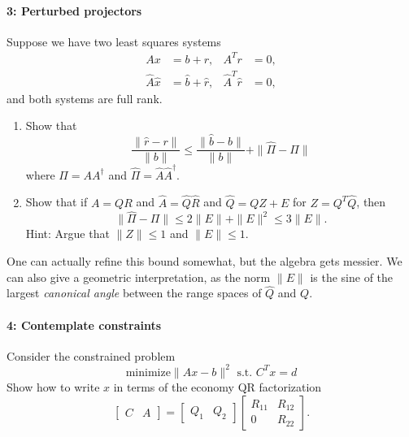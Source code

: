 \documentclass[12pt, leqno]{article} %
\begin{document}
\paragraph*{3: Perturbed projectors}
Suppose we have two least squares systems
\begin{align*}
  A x &= b + r, & A^T r &= 0, \\
  \hat{A} \hat{x} &= \hat{b} + \hat{r}, & \hat{A}^T \hat{r} &= 0,
\end{align*}
and both systems are full rank.
\begin{enumerate}
\item
  Show that
  \[
    \frac{\|\hat{r}-r\|}{\|b\|} \leq \frac{\|\hat{b}-b\|}{\|b\|}  + \|\hat{\Pi}-\Pi\|
  \]
  where $\Pi = AA^\dagger$ and $\hat{\Pi} = \hat{A} \hat{A}^\dagger$.
\item
  Show that if $A = QR$ and $\hat{A} = \hat{Q} \hat{R}$ and
  $\hat{Q} = QZ + E$ for $Z = Q^T \hat{Q}$, then
  \[
    \|\hat{\Pi}-\Pi\| \leq 2 \|E\| + \|E\|^2 \leq 3 \|E\|.
  \]
  Hint: Argue that $\|Z\| \leq 1$ and $\|E\| \leq 1$.
\end{enumerate}
One can actually refine this bound somewhat, but the algebra gets
messier.  We can also give a geometric interpretation, as
the norm $\|E\|$ is the sine of the largest {\em canonical
angle} between the range spaces of $\hat{Q}$ and $Q$.

\paragraph*{4: Contemplate constraints}
Consider the constrained problem
\[
  \mbox{minimize} \|Ax-b\|^2 \mbox{ s.t. } C^T x = d
\]
Show how to write $x$ in terms of the economy QR factorization
\[
  \begin{bmatrix} C & A \end{bmatrix} =
  \begin{bmatrix} Q_1 & Q_2 \end{bmatrix}
  \begin{bmatrix} R_{11} & R_{12} \\ 0 & R_{22} \end{bmatrix}.
\]
\end{document}
